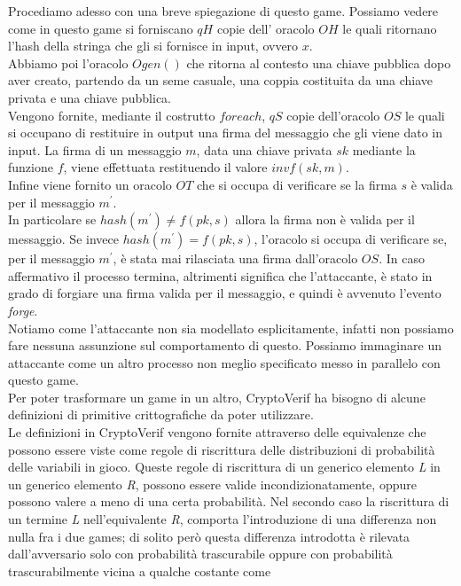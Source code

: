 \documentclass[a4paper,openright,twoside,12pt]{report}
\begin{document}
Procediamo adesso con una breve spiegazione di questo game.
Possiamo vedere come in questo game si forniscano $qH$ copie dell' oracolo $OH$ le quali ritornano l'hash della stringa che gli si fornisce in input, ovvero $x$.\\
Abbiamo poi l'oracolo $Ogen()$ che ritorna al contesto una chiave pubblica dopo aver creato, partendo da un seme casuale, una coppia costituita da una chiave privata e una chiave pubblica.\\
Vengono fornite, mediante il costrutto $foreach$, $qS$ copie dell'oracolo $OS$ le quali si occupano di restituire in output una firma del messaggio che gli viene dato in input.
La firma di un messaggio $m$, data una chiave privata $sk$ mediante la funzione $f$, viene effettuata restituendo il valore $invf(sk, m)$.\\ 
Infine viene fornito un oracolo $OT$ che si occupa di verificare se la firma $s$ \`e valida per il messaggio $m^{'}$. \\
In particolare se $hash(m^{'}) \neq f(pk, s)$ allora la firma non \`e valida per il messaggio. Se invece $hash(m^{'}) = f(pk, s)$,
l'oracolo si occupa di verificare se, per il messaggio $m^{'}$, \`e stata mai rilasciata una firma dall'oracolo $OS$. In caso affermativo il processo termina, altrimenti significa che 
l'attaccante, \`e stato in grado di forgiare una firma valida per il messaggio, e quindi \`e avvenuto l'evento \emph{forge}.\\
Notiamo come l'attaccante non sia modellato esplicitamente, infatti non possiamo fare nessuna assunzione sul comportamento di questo.
Possiamo immaginare un attaccante come un altro processo non meglio specificato messo in parallelo con questo game.\\ 
Per poter trasformare un game in un altro, CryptoVerif ha bisogno di alcune definizioni di primitive crittografiche da poter utilizzare.
\\
Le definizioni in CryptoVerif vengono fornite attraverso delle equivalenze che possono essere viste come regole di riscrittura 
delle distribuzioni di probabilit\`a delle variabili in gioco.
Queste regole di riscrittura di un generico elemento \emph{L} in un generico elemento \emph{R}, possono essere valide incondizionatamente, 
oppure possono valere a meno di una certa probabilit\`a.
Nel secondo caso la riscrittura di un termine \emph{L} nell'equivalente \emph{R}, comporta l'introduzione di una differenza non nulla fra i due games; di solito per\`o
questa differenza introdotta \`e rilevata dall'avversario solo con probabilit\`a trascurabile oppure con probabilit\`a trascurabilmente vicina a qualche costante come 
\end{document}
